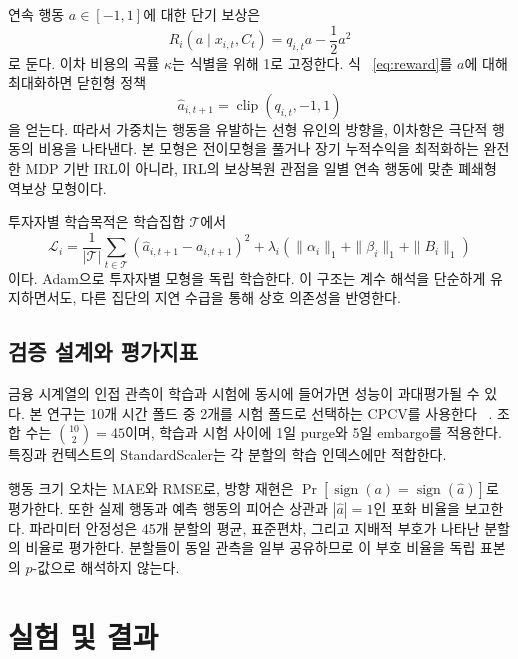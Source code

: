 \documentclass[sigconf,nonacm]{acmart}
\begin{document}
연속 행동 $a\in[-1,1]$에 대한 단기 보상은
\begin{equation}
R_i(a\mid x_{i,t},C_t)=q_{i,t}a-\frac{1}{2}a^2
\label{eq:reward}
\end{equation}
로 둔다. 이차 비용의 곡률 $\kappa$는 식별을 위해 1로 고정한다. 식
~\ref{eq:reward}를 $a$에 대해 최대화하면 닫힌형 정책
\begin{equation}
\hat a_{i,t+1}=\operatorname{clip}(q_{i,t},-1,1)
\label{eq:policy}
\end{equation}
을 얻는다. 따라서 가중치는 행동을 유발하는 선형 유인의 방향을, 이차항은 극단적
행동의 비용을 나타낸다. 본 모형은 전이모형을 풀거나 장기 누적수익을 최적화하는
완전한 MDP 기반 IRL이 아니라, IRL의 보상복원 관점을 일별 연속 행동에 맞춘
폐쇄형 역보상 모형이다.

투자자별 학습목적은 학습집합 $\mathcal{T}$에서
\begin{equation}
\mathcal{L}_i=
\frac{1}{|\mathcal{T}|}\sum_{t\in\mathcal{T}}
\left(\hat a_{i,t+1}-a_{i,t+1}\right)^2
+\lambda_i\left(
\|\alpha_i\|_1+\|\beta_i\|_1+\|B_i\|_1\right)
\label{eq:loss}
\end{equation}
이다. Adam으로 투자자별 모형을 독립 학습한다. 이 구조는 계수 해석을 단순하게
유지하면서도, 다른 집단의 지연 수급을 통해 상호 의존성을 반영한다.

\subsection{검증 설계와 평가지표}

금융 시계열의 인접 관측이 학습과 시험에 동시에 들어가면 성능이 과대평가될 수
있다. 본 연구는 10개 시간 폴드 중 2개를 시험 폴드로 선택하는 CPCV를 사용한다
~\cite{lopez2018advances}. 조합 수는 $\binom{10}{2}=45$이며, 학습과 시험 사이에
1일 purge와 5일 embargo를 적용한다. 특징과 컨텍스트의 StandardScaler는 각
분할의 학습 인덱스에만 적합한다.

행동 크기 오차는 MAE와 RMSE로, 방향 재현은
$\Pr[\operatorname{sign}(a)=\operatorname{sign}(\hat a)]$로 평가한다. 또한 실제
행동과 예측 행동의 피어슨 상관과 $|\hat a|=1$인 포화 비율을 보고한다. 파라미터
안정성은 45개 분할의 평균, 표준편차, 그리고 지배적 부호가 나타난 분할의 비율로
평가한다. 분할들이 동일 관측을 일부 공유하므로 이 부호 비율을 독립 표본의
$p$-값으로 해석하지 않는다.

\section{실험 및 결과}
\end{document}
